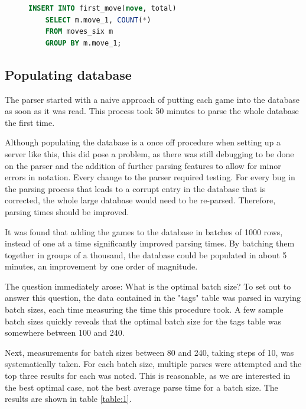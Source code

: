\documentclass{article}
\begin{document}
\begin{figure}[h]
	\begin{lstlisting}[label={lst:2}, language=sql, frame=single,
	caption=query populating table first\_move]
	INSERT INTO first_move(move, total)
	SELECT m.move_1, COUNT(*)
	FROM moves_six m
	GROUP BY m.move_1;
	\end{lstlisting}
\end{figure}

\subsection{Populating database}
The parser started with a naive approach of putting each game into the
database as soon as it was read.  This process took 50 minutes to parse the
whole database the first time.

Although populating the database is a once
off procedure when setting up a server like this, this did pose a problem,
as there was still debugging to be done on the parser and the addition of
further parsing features to allow for minor errors in notation. Every change to
the parser required testing.  For every bug in the parsing process that leads
to a corrupt entry in the database that is corrected, the whole large database
would need to be re-parsed.  Therefore, parsing times should be improved.

It was found that adding the games to the database in batches of 1000 rows,
instead of one at a time significantly improved parsing times. By batching them
together in groups of a thousand, the database could be populated in about 5
minutes, an improvement by one order of magnitude.

The question immediately arose:  What is the optimal batch size? To set out
to answer this question, the data contained in the "tags" table was parsed in
varying batch sizes, each time measuring the time this procedure took.  A
few sample batch sizes quickly reveals that the optimal batch size for the
tags table was somewhere between 100 and 240.

Next, measurements for batch sizes between 80 and
240, taking steps of 10, was systematically taken.  For each batch size,
multiple parses were attempted and the top three results for each was noted.
This is reasonable, as we are interested in the best optimal case, not the best
average parse time for a batch size.  The results are shown in table
\ref{table:1}.
\end{document}
